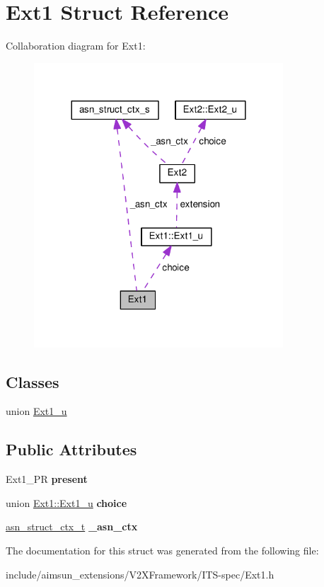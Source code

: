 \hypertarget{structExt1}{}\section{Ext1 Struct Reference}
\label{structExt1}


Collaboration diagram for Ext1\+:\nopagebreak
\begin{figure}[H]
\begin{center}
\leavevmode
\includegraphics[width=264pt]{structExt1__coll__graph}
\end{center}
\end{figure}
\subsection*{Classes}
\begin{DoxyCompactItemize}
\item 
union \hyperlink{unionExt1_1_1Ext1__u}{Ext1\+\_\+u}
\end{DoxyCompactItemize}
\subsection*{Public Attributes}
\begin{DoxyCompactItemize}
\item 
Ext1\+\_\+\+PR {\bfseries present}\hypertarget{structExt1_a671f1ed0a364d2eecd6310f7dc731f38}{}\label{structExt1_a671f1ed0a364d2eecd6310f7dc731f38}

\item 
union \hyperlink{unionExt1_1_1Ext1__u}{Ext1\+::\+Ext1\+\_\+u} {\bfseries choice}\hypertarget{structExt1_a8c05f0e95f8f372edcc87ee365e9e2e0}{}\label{structExt1_a8c05f0e95f8f372edcc87ee365e9e2e0}

\item 
\hyperlink{structasn__struct__ctx__s}{asn\+\_\+struct\+\_\+ctx\+\_\+t} {\bfseries \+\_\+asn\+\_\+ctx}\hypertarget{structExt1_a2e342c4d139c55f26096555eba57ec14}{}\label{structExt1_a2e342c4d139c55f26096555eba57ec14}

\end{DoxyCompactItemize}


The documentation for this struct was generated from the following file\+:\begin{DoxyCompactItemize}
\item 
include/aimsun\+\_\+extensions/\+V2\+X\+Framework/\+I\+T\+S-\/spec/Ext1.\+h\end{DoxyCompactItemize}
